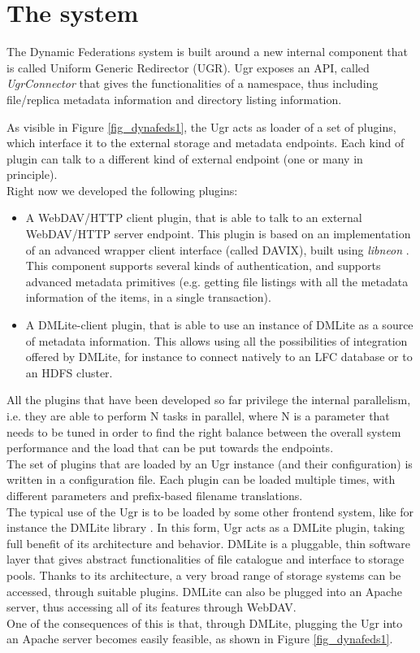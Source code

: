 \documentclass[12pt]{article} %
\begin{document}
\section{The system}

The Dynamic Federations system is built around a new internal component that is called Uniform Generic Redirector (UGR). Ugr exposes an API, called \textit{UgrConnector} that gives the functionalities of a namespace, thus including file/replica metadata information and directory listing information.

As visible in Figure \ref{fig_dynafeds1}, the Ugr acts as loader of a set of plugins, which interface it to the external storage and metadata endpoints. Each kind of plugin can talk to a different kind of external endpoint (one or many in principle).\\ Right now we developed the following plugins:

\begin{itemize}
\item A WebDAV/HTTP client plugin, that is able to talk to an external WebDAV/HTTP server endpoint. This plugin is based on an implementation of an advanced wrapper client interface (called DAVIX), built using \textit{libneon} \cite{libneon}. This component supports several kinds of authentication, and supports advanced metadata primitives (e.g. getting file listings with all the metadata information of the items, in a single transaction). 
\item A DMLite-client plugin, that is able to use an instance of DMLite as a source of metadata information. This allows using all the possibilities of integration offered by DMLite, for instance to connect natively to an LFC database or to an HDFS cluster.
\end{itemize}
All the plugins that have been developed so far privilege the internal parallelism, i.e. they are able to perform N tasks in parallel, where N is a parameter that needs to be tuned in order to find the right balance between the overall system performance and the load that can be put towards the endpoints.\\
The set of plugins that are loaded by an Ugr instance (and their configuration) is written in a configuration file. Each plugin can be loaded multiple times, with different parameters and prefix-based filename translations.\\

The typical use of the Ugr is to be loaded by some other frontend system, like for instance the DMLite library \cite{dpmnew}. In this form, Ugr acts as a DMLite plugin, taking full benefit of its architecture and behavior. DMLite is a pluggable, thin software layer that gives abstract functionalities of file catalogue and interface to storage pools. Thanks to its architecture, a very broad range of storage systems can be accessed, through suitable plugins. DMLite can also be plugged into an Apache server, thus accessing all of its features through WebDAV.\\
One of the consequences of this is that, through DMLite, plugging the Ugr into an Apache server becomes easily feasible, as shown in Figure \ref{fig_dynafeds1}.\\
\end{document}
